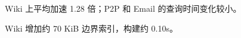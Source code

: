 {\fontsize{11}{13}\selectfont Wiki 上平均加速 1.28 倍；P2P 和 Email 的查询时间变化较小。\par Wiki 增加约 70 KiB 边界索引，构建约 0.10s。}